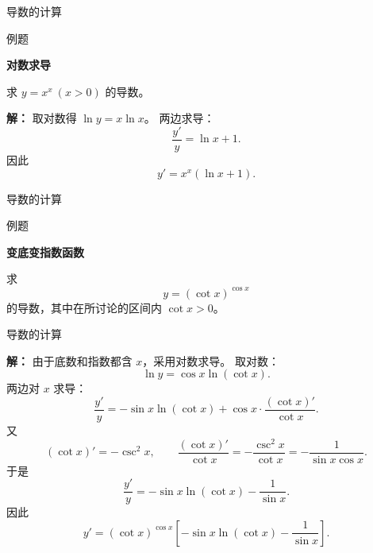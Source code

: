 \documentclass[aspectratio=169,10pt,fontset=fandol]{ctexbeamer}
\newenvironment{warning}{\par\noindent\textbf{注：}\quad}{\par\vspace{0.8em}}
\begin{document}
\begin{frame}[t,fragile]{导数的计算}
\normalsize
\begin{block}{例题}
{\normalsize
\textbf{对数求导}\par

	求 $y=x^x\ (x>0)$ 的导数。

}
\end{block}
\pause
{\normalsize
\textbf{解：}
取对数得 $\ln y=x\ln x$。 两边求导：
	\[
	\frac{y'}{y}=\ln x+1.
	\]
	因此
	\[
	y'=x^x(\ln x+1).
	\]

}
\end{frame}
\begin{frame}[t,fragile]{导数的计算}
\normalsize
\begin{block}{例题}
{\normalsize
\textbf{变底变指数函数}\par

	求
	\[
	y=(\cot x)^{\cos x}
	\]
	的导数，其中在所讨论的区间内 $\cot x>0$。

}
\end{block}
\end{frame}
\begin{frame}[t,fragile]{导数的计算}
\footnotesize
{\footnotesize
\textbf{解：}
由于底数和指数都含 $x$，采用对数求导。 取对数：
	\[
	\ln y=\cos x\ln(\cot x).
	\]
	两边对 $x$ 求导：
	\[
	\frac{y'}{y}
	=-\sin x\ln(\cot x)+\cos x\cdot\frac{(\cot x)'}{\cot x}.
	\]
	又
	\[
	(\cot x)'=-\csc^2x,\qquad
	\frac{(\cot x)'}{\cot x}
	=-\frac{\csc^2x}{\cot x}
	=-\frac{1}{\sin x\cos x}.
	\]
	于是
	\[
	\frac{y'}{y}
	=-\sin x\ln(\cot x)-\frac1{\sin x}.
	\]
	因此
	\[
	y'=(\cot x)^{\cos x}\left[-\sin x\ln(\cot x)-\frac1{\sin x}\right].
	\]

}
\end{frame}
\end{document}
